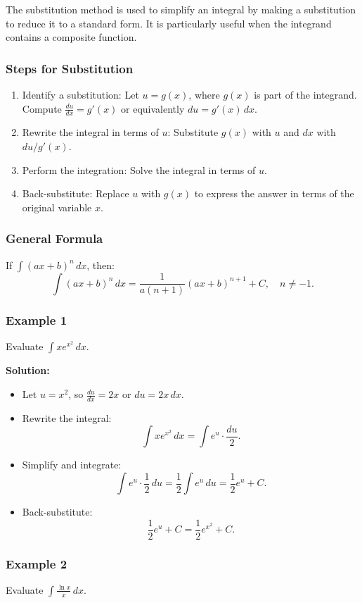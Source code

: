\documentclass{article}
\begin{document}
\begin{multicols}{2}
The substitution method is used to simplify an integral by making a substitution to reduce it to a standard form. It is particularly useful when the integrand contains a composite function.

\subsubsection*{Steps for Substitution}
\begin{enumerate}
    \item Identify a substitution: Let \( u = g(x) \), where \( g(x) \) is part of the integrand. Compute \( \frac{du}{dx} = g'(x) \) or equivalently \( du = g'(x) \, dx \).
    \item Rewrite the integral in terms of \( u \): Substitute \( g(x) \) with \( u \) and \( dx \) with \( du / g'(x) \).
    \item Perform the integration: Solve the integral in terms of \( u \).
    \item Back-substitute: Replace \( u \) with \( g(x) \) to express the answer in terms of the original variable \( x \).
\end{enumerate}

\subsubsection*{General Formula}
If \( \int (ax + b)^n \, dx \), then:
\[
\int (ax + b)^n \, dx = \frac{1}{a(n+1)} (ax + b)^{n+1} + C, \quad n \neq -1.
\]

\subsubsection*{Example 1}
Evaluate \( \int x e^{x^2} \, dx \).

\textbf{Solution:}
\begin{itemize}
    \item Let \( u = x^2 \), so \( \frac{du}{dx} = 2x \) or \( du = 2x \, dx \).
    \item Rewrite the integral: \[ \int x e^{x^2} \, dx = \int e^u \cdot \frac{du}{2}. \]
    \item Simplify and integrate: \[ \int e^u \cdot \frac{1}{2} \, du = \frac{1}{2} \int e^u \, du = \frac{1}{2} e^u + C. \]
    \item Back-substitute: \[ \frac{1}{2} e^u + C = \frac{1}{2} e^{x^2} + C. \]
\end{itemize}

\subsubsection*{Example 2}
Evaluate \( \int \frac{\ln x}{x} \, dx \).


\end{multicols}
\end{document}
